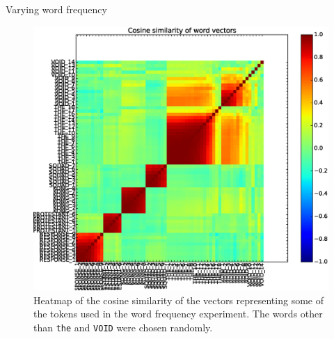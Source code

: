 \documentclass{article} %
\newcommand{\word}[1]{\texttt{#1}}
\begin{document}
\begin{section}{Varying word frequency}
\begin{figure}
	\includegraphics[scale=0.5]{word-frequency-experiment-heatmap}
	\caption{ Heatmap of the cosine similarity of the vectors
          representing some of the tokens used in the word frequency
          experiment.  The words other than \word{the} and \word{VOID}
          were chosen randomly.  }
	\label{word-frequency-experiment-heatmap}
\end{figure}

\begin{table}
	
	\caption{ Words in the original vocabulary most similar to the
          tokens \word{THE\_i}, and their cosine similarity with the
          most frequent such token, \word{THE\_1}.  It is apparent from
          the nearest neigbour list that the vectors of the
          low-frequency tokens have not been adequately trained.  }
	\label{word-frequency-experiment-cosine-similarity}
\end{table}


\end{section}
\end{document}
